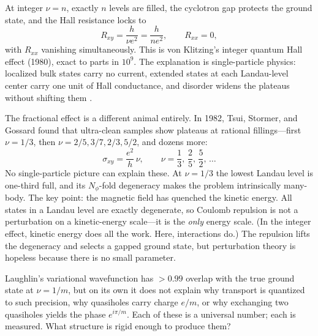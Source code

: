 At integer $\nu = n$, exactly $n$ levels are filled, the cyclotron gap protects the ground state, and the Hall resistance locks to
\begin{equation}
  R_{xy} = \frac{h}{\nu e^2} = \frac{h}{n e^2}, \qquad R_{xx} = 0,
  \label{eq:iqhe-plateaus}
\end{equation}
with $R_{xx}$ vanishing simultaneously. This is von Klitzing's integer quantum Hall effect (1980), exact to parts in $10^{9}$. The explanation is single-particle physics: localized bulk states carry no current, extended states at each Landau-level center carry one unit of Hall conductance, and disorder widens the plateaus without shifting them \cite{TongQuantumHallLectures}.

The fractional effect is a different animal entirely. In 1982, Tsui, Stormer, and Gossard \cite{TsuiStormerGossard1982FQHEDiscovery} found that ultra-clean samples show plateaus at rational fillings---first $\nu = 1/3$, then $\nu = 2/5, 3/7, 2/3, 5/2$, and dozens more:
\begin{equation}
  \sigma_{xy}
  =
  \frac{e^2}{h}\,\nu,
  \qquad
  \nu = \frac{1}{3},\,\frac{2}{5},\,\frac{5}{2},\,\ldots
  \label{eq:fqhe-conductance}
\end{equation}
No single-particle picture can explain these. At $\nu = 1/3$ the lowest Landau level is one-third full, and its $N_\phi$-fold degeneracy makes the problem intrinsically many-body. The key point: the magnetic field has quenched the kinetic energy. All states in a Landau level are exactly degenerate, so Coulomb repulsion is not a perturbation on a kinetic-energy scale---it is the \emph{only} energy scale. (In the integer effect, kinetic energy does all the work. Here, interactions do.) The repulsion lifts the degeneracy and selects a gapped ground state, but perturbation theory is hopeless because there is no small parameter.

Laughlin's variational wavefunction \cite{Laughlin1983AnomalousQHE} has $>0.99$ overlap with the true ground state at $\nu = 1/m$, but on its own it does not explain why transport is quantized to such precision, why quasiholes carry charge $e/m$, or why exchanging two quasiholes yields the phase $e^{i\pi/m}$. Each of these is a universal number; each is measured. What structure is rigid enough to produce them?

